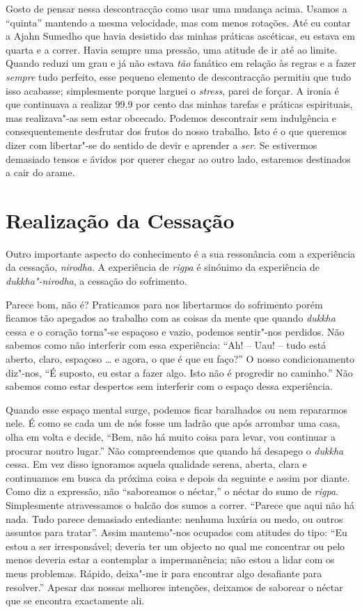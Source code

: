 Gosto de pensar nessa descontracção como usar uma mudança acima. Usamos
a ``quinta'' mantendo a mesma velocidade, mas com menos rotações. Até eu
contar a Ajahn Sumedho que havia desistido das minhas práticas
ascéticas, eu estava em quarta e a correr. Havia sempre uma pressão, uma
atitude de ir até ao limite. Quando reduzi um grau e já não estava
\emph{tão} fanático em relação às regras e a fazer \emph{sempre} tudo
perfeito, esse pequeno elemento de descontracção permitiu que tudo isso
acabasse; simplesmente porque larguei o \emph{stress}, parei de forçar.
A ironia é que continuava a realizar 99.9 por cento das minhas tarefas e
práticas espirituais, mas realizava"-as sem estar obcecado. Podemos
descontrair sem indulgência e consequentemente desfrutar dos frutos do
nosso trabalho. Isto é o que queremos dizer com libertar"-se do sentido
de devir e aprender a \emph{ser}. Se estivermos demasiado tensos e
ávidos por querer chegar ao outro lado, estaremos destinados a cair do
arame.

\section{Realização da Cessação}

Outro importante aspecto do conhecimento é a sua ressonância com a
experiência da cessação, \emph{nirodha}. A experiência de \emph{rigpa} é
sinónimo da experiência de \emph{dukkha"-nirodha}, a cessação do
sofrimento.

Parece bom, não é? Praticamos para nos libertarmos do sofrimento porém
ficamos tão apegados ao trabalho com as coisas da mente que
quando \emph{dukkha} cessa e o coração torna"-se espaçoso e vazio,
podemos sentir"-nos perdidos. Não sabemos como não interferir com essa
experiência: ``Ah! -- Uau! -- tudo está aberto, claro, espaçoso \ldots{}
e agora, o que é que eu faço?'' O nosso condicionamento diz"-nos, ``É
suposto, eu estar a fazer algo. Isto não é progredir no caminho.'' Não
sabemos como estar despertos sem interferir com o espaço dessa
experiência.

Quando esse espaço mental surge, podemos ficar baralhados ou nem
repararmos nele. É como se cada um de nós fosse um ladrão que após
arrombar uma casa, olha em volta e decide, ``Bem, não há muito coisa
para levar, vou continuar a procurar noutro lugar.'' Não compreendemos
que quando há desapego o \emph{dukkha} cessa. Em vez disso ignoramos
aquela qualidade serena, aberta, clara e continuamos em busca da próxima
coisa e depois da seguinte e assim por diante. Como diz a expressão, não
``saboreamos o néctar,'' o néctar do sumo de \emph{rigpa}. Simplesmente
atravessamos o balcão dos sumos a correr. ``Parece que aqui não há nada.
Tudo parece demasiado entediante: nenhuma luxúria ou medo, ou outros
assuntos para tratar''. Assim mantemo"-nos ocupados com atitudes do tipo:
``Eu estou a ser irresponsável; deveria ter um objecto no qual me
concentrar ou pelo menos deveria estar a contemplar a impermanência; não
estou a lidar com os meus problemas. Rápido, deixa"-me ir para encontrar
algo desafiante para resolver.'' Apesar das nossas melhores intenções,
deixamos de saborear o néctar que se encontra exactamente ali.

